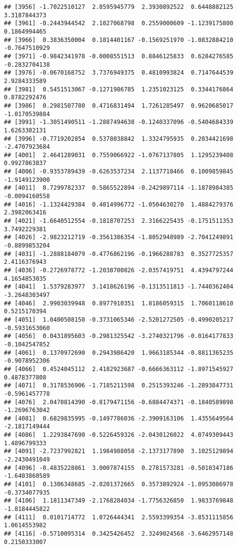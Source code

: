 \documentclass[
]{article}
\begin{document}
\begin{verbatim}
## [3956] -1.7022510127  2.8595945779  2.3930892522  0.6448882125  3.3187844373
## [3961] -0.2443944542  2.1027068798  0.2559000609 -1.1239175800  0.1864994465
## [3966]  0.3836350004  0.1814401167 -0.1569251970 -1.0832884210 -0.7647510929
## [3971] -0.9842341978 -0.0008551513  0.8846125833  0.6284276585 -0.2832704138
## [3976] -0.0670168752  3.7376949375  0.4810993824  0.7147644539  2.9284333589
## [3981]  0.5451513067 -0.1271986785  1.2351023125  0.3344176864  0.8782292476
## [3986]  0.2981507780  0.4716831494  1.7261285497  0.9620685017 -1.0170539884
## [3991] -1.3051490511 -1.2887494638 -0.1240337096 -0.5404684339  1.6263302131
## [3996] -0.7719202854  0.5378038842  1.3324795935  0.2034421698 -2.4707923684
## [4001]  2.4641289031  0.7559066922 -1.0767137805  1.1295239408  0.9927863837
## [4006] -0.9353789439 -0.6263537234  2.1137718466  0.1009859845 -1.9149123900
## [4011]  0.7299782337  0.5865522894 -0.2429897114 -1.1878984385 -0.0094160558
## [4016] -1.1324429384  0.4014996772 -1.0504630270  1.4884279376  2.3982063416
## [4021] -1.6640512554 -0.1818707253  2.3166225435 -0.1751511353  3.7492229381
## [4026] -2.9823212719 -0.3561386354 -1.8052948989 -2.7041249891 -0.8899853204
## [4031] -1.2888184079 -0.4776862196 -0.1966288783  0.3527725357  2.4116376943
## [4036] -0.2726978772 -1.2038700826 -2.0357419751  4.4394797244  4.1654853035
## [4041]  1.5379283977  3.1418626196 -0.1313511813 -1.7440362404 -3.2648303497
## [4046]  2.9903039948  0.8977910351  1.8186059315  1.7060118610  0.5215170394
## [4051]  1.0400508150 -0.3731065346 -2.5201272505 -0.4990205217 -0.5931653060
## [4056]  0.0431895603 -0.2981325542 -3.2740321796 -0.0164177833 -0.1042547852
## [4061]  0.1370972690  0.2943986420  1.9663185344 -0.8811365235 -0.9078952306
## [4066]  0.4524045112  2.4182923687 -0.6666363112 -1.8971545927  0.4878377808
## [4071]  0.3178536906 -1.7185211598  0.2515393246 -1.2893847731 -0.5961457778
## [4076]  2.0470814390 -0.8179471156 -0.6884474371 -0.1840589898 -1.2696763042
## [4081]  0.6829835995 -0.1497786036 -2.3909163106  1.4355649564 -2.1817149444
## [4086]  1.2293847690 -0.5226459326 -2.0430126022  4.0749309443  1.4896799333
## [4091] -2.7237992821  1.1984988058 -2.1373177890  3.1025129894 -2.2430491049
## [4096] -0.4835228861  3.0007874155  0.2781573281 -0.5010347186 -1.6403860589
## [4101]  0.1306348685 -2.0201372665  0.3573892924 -1.0953086978 -0.3734077935
## [4106]  1.1811347349 -2.1768284034 -1.7756326850  1.9833769848 -1.8184445822
## [4111]  0.0101714772  1.0726444341  2.5593399354 -3.8531115856  1.0614553982
## [4116] -0.5710095314  0.3425426452  2.3249024568 -3.6462957148  0.2150333007

\end{verbatim}
\end{document}
